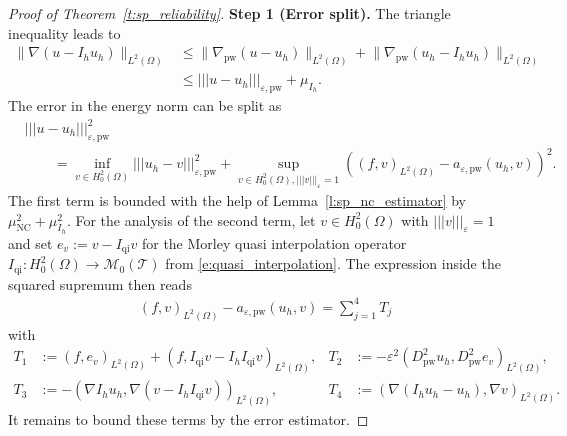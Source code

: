\documentclass[10pt,a4paper]{amsart}
\newcommand{\ennorm}[1]{\lvert\!\lvert\!\lvert #1 \rvert\!\rvert\!\rvert}
\newcommand{\nc}{\mathrm{NC}}
\newcommand{\pw}{\mathrm{pw}}
\newcommand{\tri}{\mathcal{T}}
\begin{document}
\begin{proof}[Proof of Theorem~\ref{t:sp_reliability}]
    \textbf{Step 1 (Error split).}
    The triangle inequality leads to
    \begin{align*}
        \lVert \nabla(u-I_h u_h)\rVert_{L^2(\Omega)}
        &\leq \lVert \nabla_\pw(u- u_h)\rVert_{L^2(\Omega)}
           + \lVert \nabla_\pw(u_h-I_h u_h)\rVert_{L^2(\Omega)}\\
        &\leq \ennorm{u-u_h}_{\varepsilon,\pw} + \mu_{I_h}.
    \end{align*}
    The error in the energy norm can be split as 
    \begin{align*}
        &\ennorm{u-u_h}_{\varepsilon,\pw}^2\\
        &\qquad
        =\inf_{v\in H^2_0(\Omega)} \ennorm{u_h-v}_{\varepsilon,\pw}^2
           + \sup_{v\in H^2_0(\Omega),\ennorm{v}_\varepsilon=1}
            \left( 
             (f,v)_{L^2(\Omega)} - a_{\varepsilon,\pw}(u_h,v) \right)^2.
    \end{align*}
    The first term is bounded with the help of 
    Lemma~\ref{l:sp_nc_estimator} by $\mu_\nc^2+\mu_{I_h}^2$.
    For the analysis of the second term,
    let $v\in H^2_0(\Omega)$ with $\ennorm{v}_\varepsilon=1$ and 
    set $e_v:=v-I_\mathrm{qi}v$ for the Morley quasi interpolation operator
    $I_\mathrm{qi}:H^2_0(\Omega)\to\mathcal{M}_0(\tri)$
    from \eqref{e:quasi_interpolation}.
    The expression inside the squared supremum then reads
    \begin{equation*}
    \begin{aligned}
        &(f,v)_{L^2(\Omega)} - a_{\varepsilon,\pw}(u_h,v)
        = \sum_{j=1}^4 T_j
    \end{aligned}
    \end{equation*}
    with 
    \begin{align*}
        T_1&:=(f,e_v)_{L^2(\Omega)} + (f, I_\mathrm{qi}v-I_hI_\mathrm{qi}v)_{L^2(\Omega)},
        &
        T_2&:=-\varepsilon^2 (D^2_\pw u_h,D^2_\pw e_v)_{L^2(\Omega)},\\
        T_3&:=- (\nabla I_h u_h,\nabla (v-I_h I_\mathrm{qi}v))_{L^2(\Omega)},
        &
        T_4&:= (\nabla (I_h u_h-u_h),\nabla v)_{L^2(\Omega)}.
    \end{align*}
    It remains to bound these terms by the error estimator.


\end{proof}
\end{document}
